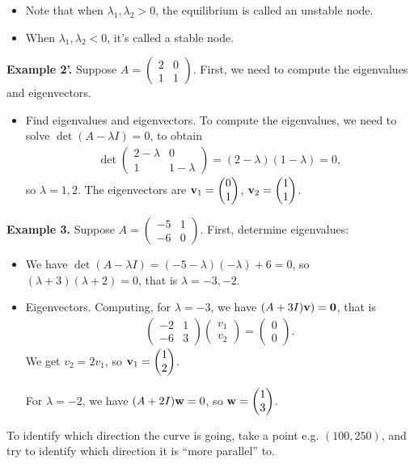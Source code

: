 \documentclass{article}
\newcommand{\mat}[1]{\begin{pmatrix}#1\end{pmatrix}}
\begin{document}
\begin{itemize}
  \item Note that when $\lambda_1, \lambda_2 > 0$, the equilibrium is called an unstable node.
  \item When $\lambda_1, \lambda_2 < 0$, it's called a stable node.
\end{itemize}

{\bf Example 2'.} Suppose $A = \mat{2 & 0 \\ 1 & 1}$.  First, we need to compute the eigenvalues and eigenvectors.

\begin{itemize}
  \item Find eigenvalues and eigenvectors. To compute the eigenvalues, we need to solve $\det(A - \lambda I) = 0$, to obtain
    \begin{align*}
      \det \mat{2 - \lambda & 0 \\ 1 & 1 - \lambda} = (2 - \lambda)(1 - \lambda) = 0,
    \end{align*}
    so $\lambda = 1, 2$.  The eigenvectors are $\mbf{v}_1 = \mat{0 \\ 1}$, $\mbf{v}_2 = \mat{1 \\ 1}$.
\end{itemize}

{\bf Example 3.} Suppose $A = \mat{-5 & 1 \\ -6 & 0}$.  First, determine eigenvalues:

\begin{itemize}
  \item We have $\det (A - \lambda I) = (-5 - \lambda)(-\lambda) + 6 = 0$, so $(\lambda + 3)(\lambda+2) = 0$, that is $\lambda = -3, -2$.
  \item Eigenvectors. Computing, for $\lambda = -3$, we have $(A + 3I) \mathbf{v}) = \mathbf{0}$, that is
  \begin{align*}
    \mat{-2 & 1 \\ -6 & 3} \mat{v_1 \\ v_2} = \mat{0 \\ 0}.
  \end{align*}
  We get $v_2 = 2v_1$, so $\mbf{v}_1 = \mat{1 \\ 2}$.

  For $\lambda = -2$, we have $(A + 2I) \mathbf{w} = 0$, so $\mbf{w} = \mat{1 \\ 3}$.
\end{itemize}

To identify which direction the curve is going, take a point e.g. $(100, 250)$, and try to identify which direction it is ``more parallel'' to.
\end{document}
